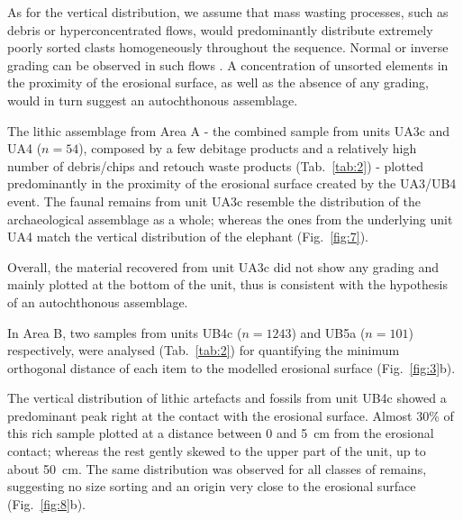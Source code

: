 \documentclass[preprint,authoryear,times]{elsarticle} %
\begin{document}

As for the vertical distribution, we assume that mass wasting processes, such as debris or hyperconcentrated flows, would predominantly distribute extremely poorly sorted clasts homogeneously throughout the sequence. Normal or inverse grading can be observed in such flows \citep{Pierson2005}. A concentration of unsorted elements in the proximity of the erosional surface, as well as the absence of any grading, would in turn suggest an autochthonous assemblage.


The lithic assemblage from Area A - the combined sample from units UA3c and UA4 ($n = 54$), composed by a few debitage products and a relatively high number of debris/chips and retouch waste products (Tab.~\ref{tab:2}) - plotted predominantly in the proximity of the erosional surface created by the UA3/UB4 event. The faunal remains from unit UA3c resemble the distribution of the archaeological assemblage as a whole; whereas the ones from the underlying unit UA4 match the vertical distribution of the elephant (Fig.~\ref{fig:7}).

Overall, the material recovered from unit UA3c did not show any grading and mainly plotted at the bottom of the unit, thus is consistent with the hypothesis of an autochthonous assemblage.


In Area B, two samples from units UB4c ($n = 1243$) and UB5a ($n = 101$) respectively, were analysed (Tab.~\ref{tab:2}) for quantifying the minimum orthogonal distance of each item to the modelled erosional surface (Fig.~\ref{fig:3}b).

The vertical distribution of lithic artefacts and fossils from unit UB4c showed a predominant peak right at the contact with the erosional surface. Almost 30\% of this rich sample plotted at a distance between 0 and 5~cm from the erosional contact; whereas the rest gently skewed to the upper part of the unit, up to about 50~cm. The same distribution was observed for all classes of remains, suggesting no size sorting and an origin very close to the erosional surface (Fig.~\ref{fig:8}b).
\end{document}
